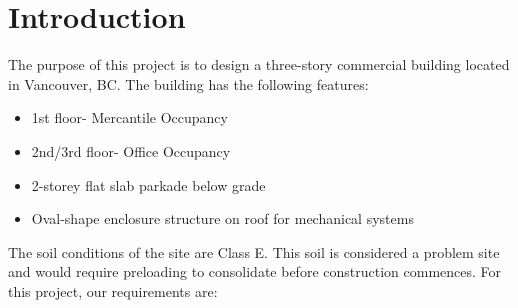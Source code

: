 \documentclass[12pt]{article}
\begin{document}
\section{Introduction}
The purpose of this project is to design a three-story commercial building located in Vancouver, BC.
The building has the following features:
\begin{itemize}
    \item 1st floor- Mercantile Occupancy
    \item 2nd/3rd floor- Office Occupancy
    \item 2-storey flat slab parkade below grade
    \item Oval-shape enclosure structure on roof for mechanical systems
\end{itemize}
The soil conditions of the site are Class E.
This soil is considered a problem site and would require preloading to consolidate before construction commences.
For this project, our requirements are:
\end{document}
